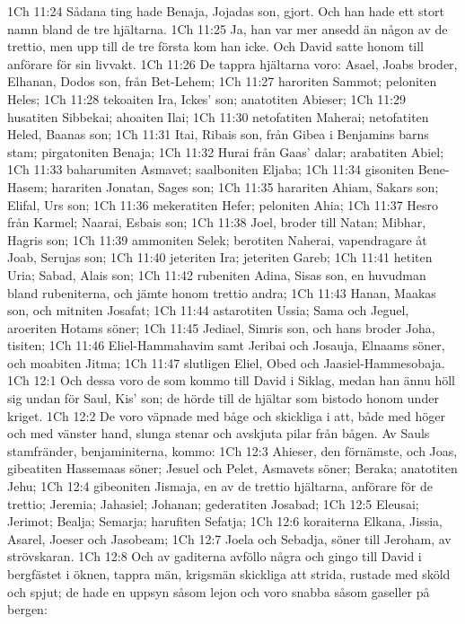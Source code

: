 1Ch 11:24  Sådana ting hade Benaja, Jojadas son, gjort. Och han hade ett stort namn bland de tre hjältarna.
1Ch 11:25  Ja, han var mer ansedd än någon av de trettio, men upp till de tre första kom han icke. Och David satte honom till anförare för sin livvakt.
1Ch 11:26  De tappra hjältarna voro: Asael, Joabs broder, Elhanan, Dodos son, från Bet-Lehem;
1Ch 11:27  haroriten Sammot; peloniten Heles;
1Ch 11:28  tekoaiten Ira, Ickes' son; anatotiten Abieser;
1Ch 11:29  husatiten Sibbekai; ahoaiten Ilai;
1Ch 11:30  netofatiten Maherai; netofatiten Heled, Baanas son;
1Ch 11:31  Itai, Ribais son, från Gibea i Benjamins barns stam; pirgatoniten Benaja;
1Ch 11:32  Hurai från Gaas' dalar; arabatiten Abiel;
1Ch 11:33  baharumiten Asmavet; saalboniten Eljaba;
1Ch 11:34  gisoniten Bene-Hasem; harariten Jonatan, Sages son;
1Ch 11:35  harariten Ahiam, Sakars son; Elifal, Urs son;
1Ch 11:36  mekeratiten Hefer; peloniten Ahia;
1Ch 11:37  Hesro från Karmel; Naarai, Esbais son;
1Ch 11:38  Joel, broder till Natan; Mibhar, Hagris son;
1Ch 11:39  ammoniten Selek; berotiten Naherai, vapendragare åt Joab, Serujas son;
1Ch 11:40  jeteriten Ira; jeteriten Gareb;
1Ch 11:41  hetiten Uria; Sabad, Alais son;
1Ch 11:42  rubeniten Adina, Sisas son, en huvudman bland rubeniterna, och jämte honom trettio andra;
1Ch 11:43  Hanan, Maakas son, och mitniten Josafat;
1Ch 11:44  astarotiten Ussia; Sama och Jeguel, aroeriten Hotams söner;
1Ch 11:45  Jediael, Simris son, och hans broder Joha, tisiten;
1Ch 11:46  Eliel-Hammahavim samt Jeribai och Josauja, Elnaams söner, och moabiten Jitma;
1Ch 11:47  slutligen Eliel, Obed och Jaasiel-Hammesobaja.
1Ch 12:1  Och dessa voro de som kommo till David i Siklag, medan han ännu höll sig undan för Saul, Kis' son; de hörde till de hjältar som bistodo honom under kriget.
1Ch 12:2  De voro väpnade med båge och skickliga i att, både med höger och med vänster hand, slunga stenar och avskjuta pilar från bågen. Av Sauls stamfränder, benjaminiterna, kommo:
1Ch 12:3  Ahieser, den förnämste, och Joas, gibeatiten Hassemaas söner; Jesuel och Pelet, Asmavets söner; Beraka; anatotiten Jehu;
1Ch 12:4  gibeoniten Jismaja, en av de trettio hjältarna, anförare för de trettio; Jeremia; Jahasiel; Johanan; gederatiten Josabad;
1Ch 12:5  Eleusai; Jerimot; Bealja; Semarja; harufiten Sefatja;
1Ch 12:6  koraiterna Elkana, Jissia, Asarel, Joeser och Jasobeam;
1Ch 12:7  Joela och Sebadja, söner till Jeroham, av strövskaran.
1Ch 12:8  Och av gaditerna avföllo några och gingo till David i bergfästet i öknen, tappra män, krigsmän skickliga att strida, rustade med sköld och spjut; de hade en uppsyn såsom lejon och voro snabba såsom gaseller på bergen:
